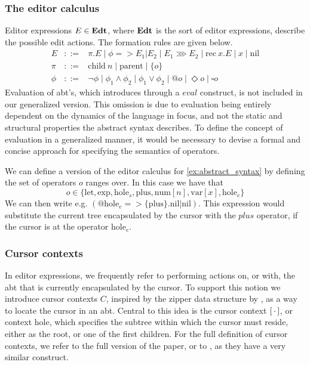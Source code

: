 \documentclass[sigplan,anonymous,review]{acmart}
\begin{document}
\subsubsection{The editor calculus}
Editor expressions $E \in \textbf{Edt}$, where $\textbf{Edt}$ is the sort of editor
expressions, describe the possible edit actions. The formation rules
are given below.
%
\begin{align*}
  E & ::= & \pi.E  \mid  \phi => E_1|E_2  \mid  E_1 \ggg E_2  \mid  \text{rec} \ x.E  \mid  x  \mid  \text{nil} \\
    \pi & ::= & \text{child} \ n  \mid  \text{parent}  \mid  \{o\} \\
    \phi & ::= & \neg\phi  \mid  \phi_1 \wedge \phi_2  \mid  \phi_1 \vee \phi_2  \mid  @o  \mid  \Diamond o  \mid  \square o
\end{align*}
%
Evaluation of abt's, which \cite{type_safe_structure_editor} introduces through a $eval$ construct, is not included in our generalized version. This omission is due to evaluation being entirely dependent on the dynamics of the language in focus, and not the static and structural properties the abstract syntax describes. To define the concept of evaluation in a generalized manner, it would be necessary to devise a formal and concise approach for specifying the semantics of operators.

\begin{example}\label{ex:editor_calculus}
    We can define a version of the editor calculus for
    \cref{ex:abstract_syntax} by defining the set of operators $o$ ranges over. In this case we have that
    \begin{equation*}
        o \in \{ \text{let}, \text{exp}, \text{hole}_s, \text{plus}, \text{num}[n], \text{var}[x], \text{hole}_e \}
    \end{equation*}
    We can then write e.g. $(@\text{hole}_e =>
    \{\text{plus}\}.\text{nil}|\text{nil})$. This expression would
    substitute the current tree encapsulated by the cursor with the
    $plus$ operator, if the cursor is at the operator
    $\text{hole}_e$. 
\end{example}

\subsubsection{Cursor contexts}
In editor expressions, we frequently refer to performing actions on, or with, the abt that is currently encapsulated by the cursor. To support this notion we introduce cursor contexts $C$, inspired by the zipper data structure by \cite{huet_zipper}, as a way to locate the cursor in an abt. Central to this idea is the cursor context $[ \, \cdot \, ]$, or context hole, which specifies the subtree within which the cursor must reside, either as the root, or one of the first children.  For the full definition of cursor contexts, we refer to the full version of the paper, or to \cite{type_safe_structure_editor}, as they have a very similar construct.
\end{document}
